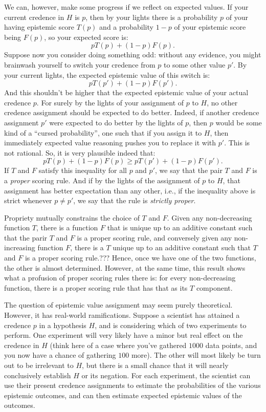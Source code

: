 We can, however, make some progress if we reflect on expected values. If your current credence in $H$ is $p$, then by your lights
there is a probability $p$ of your having epistemic score $T(p)$ and a probability $1-p$ of your epistemic score being $F(p)$, so
your expected score is:
$$
    p T(p) + (1-p) F(p).
$$
Suppose now you consider doing something odd: without any evidence, you might brainwash yourself to switch your credence from $p$ to some 
other value $p'$. By your current lights, the expected epistemic value of this switch is:
$$
    p T(p') + (1-p) F(p').
$$
And this shouldn't be higher that the expected epistemic value of your actual credence $p$. For surely by the lights of your
assignment of $p$ to $H$, no other credence assignment should be expected to do better. Indeed, if another credence assignment
$p'$ were expected to do better by the lights of $p$, then $p$ would be some kind of a ``cursed probability'', one such that
if you assign it to $H$, then immediately expected value reasoning pushes you to replace it with $p'$. This is not rational.
So, it is very plausible indeed that:
$$
    p T(p) + (1-p) F(p) \ge
    p T(p') + (1-p) F(p').
$$
If $T$ and $F$ satisfy this inequality for all $p$ and $p'$, we say that the pair $T$ and $F$ is a \textit{proper} scoring rule.
And if by the lights of the assignment of $p$ to $H$, that assignment has better expectation than any other, i.e., if the
inequality above is strict whenever $p\ne p'$, we say that the rule is \textit{strictly proper}.

Propriety mutually constrains the choice of $T$ and $F$. Given any non-decreasing function $T$, there is a
function $F$ that is unique up to an additive constant such that the parir $T$ and $F$ is a proper scoring rule, and conversely given
any non-increasing function $F$, there is a $T$ unique up to an additive constant such that $T$ and $F$ is a proper scoring rule.???
Hence, once we have one of the two functions, the other is almost determined. However, at the same time, this result shows what
a profusion of proper scoring rules there is: for every non-decreasing function, there is a proper scoring rule that has that as 
its $T$ component.

The question of epistemic value assignment may seem purely theoretical. However, it has real-world ramifications. 
Suppose a scientist has attained a credence $p$ in a hypothesis $H$, and is considering which of two experiments to
perform. One experiment will very likely have a minor but real effect on the credence in $H$ (think here of a case
where you've gathered $1000$ data points, and you now have a chance of gathering $100$ more). The other will most
likely be turn out to be irrelevant to $H$, but there is a small chance that it will nearly conclusively establish
$H$ or its negation. For each experiment, the scientist can use their present credence assignments to estimate the
probabilities of the various epistemic outcomes, and can then estimate expected epistemic values of the outcomes.


